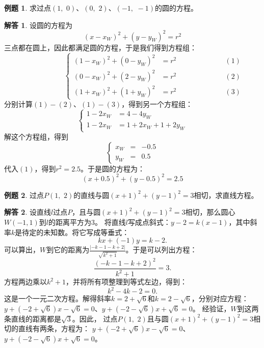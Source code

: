 \documentclass[12pt,UTF8]{ctexbook}
\theoremstyle{definition}
\newtheorem{et}{例题}[section]
\newtheorem*{so}{解答}
\theoremstyle{plain}
\begin{document}
\begin{et}
    求过点$(1, \,\, 0)$、$(0, \,\, 2)$、$(-1, \,\, -1)$的圆的方程。
\end{et}
\begin{so}
    设圆的方程为
    $$(x - x_W)^2 + (y - y_W)^2 = r^2$$
    三点都在圆上，因此都满足圆的方程，于是我们得到方程组：
    $$
    \qquad\qquad\qquad \left\{
    \begin{array}{llr}
        (1 - x_W)^2 + (0 - y_W)^2 &= r^2 &\qquad\qquad\qquad (1) \\
        (0 - x_W)^2 + (2 - y_W)^2 &= r^2 &\qquad\qquad\qquad (2) \\
        (1 + x_W)^2 + (1 + y_W)^2 &= r^2 &\qquad\qquad\qquad (3)
    \end{array}
    \right.
    $$
    分别计算$(1) - (2)$、$(1) - (3)$，得到另一个方程组：
    $$
    \left\{
    \begin{array}{ll}
        1 - 2x_W &= 4 - 4y_W \\
        1 - 2x_W &= 1 + 2x_W + 1 + 2y_W 
    \end{array}
    \right.
    $$  
    解这个方程组，得到
    $$
    \left\{
    \begin{array}{clr}
        x_W &=& -0.5 \\
        y_W &=& 0.5
    \end{array}
    \right.
    $$  
    代入$(1)$，得到$r^2 = 2.5$。于是圆的方程为：
    $$(x + 0.5)^2 + (y - 0.5)^2 = 2.5$$
\end{so}

\begin{et}
    过点$P(1, \,\, 2)$的直线与圆$(x + 1)^2 + (y - 1)^2 = 3$相切，求直线方程。
\end{et}
\begin{so}
设直线$l$过点$P$，且与圆$(x + 1)^2 + (y - 1)^2 = 3$相切，那么圆心$W(-1, 1)$到$l$的距离平方为$3$。
将直线$l$写成点斜式：$y - 2 = k(x - 1) $，其中斜率$k$是待定的未知数。将它写成等垂式：
$$kx + (-1)y = k - 2. $$
可以算出，$W$到它的距离为$\frac{|- k - 1 - k + 2|}{\sqrt{k^2 + 1}}$。于是可以列出方程：
$$\frac{(- k - 1 - k + 2)^2}{k^2 + 1} = 3.$$
方程两边乘以$k^2 + 1$，并将所有项整理到等式左边，得到：
$$ k^2 - 4k - 2 = 0.$$
这是一个一元二次方程。解得斜率$k = 2 + \sqrt{6}$和$k = 2 - \sqrt{6}$，分别对应方程：
$y + (- 2 + \sqrt{6}) x - \sqrt{6} = 0$、$y + (- 2 - \sqrt{6}) x + \sqrt{6} = 0$。
经验证，$W$到这两条直线的距离都是$\sqrt{3}$。因此，
过点$P(1, \,\, 2)$且与圆$(x + 1)^2 + (y - 1)^2 = 3$相切的直线有两条，方程为：
$y + (- 2 + \sqrt{6}) x - \sqrt{6} = 0$、$y + (- 2 - \sqrt{6}) x + \sqrt{6} = 0$。    
\end{so}
\end{document}
